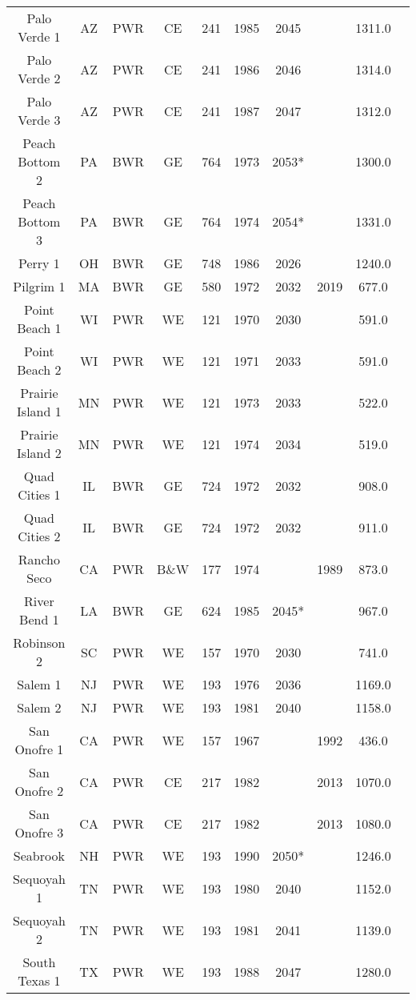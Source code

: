 \begin{table}
\begin{tabular}{c c c c c c c c c c}
    Palo Verde 1 & AZ & PWR & CE & 241 & 1985 & 2045 &  & 1311.0 \\
    Palo Verde 2 & AZ & PWR & CE & 241 & 1986 & 2046 &  & 1314.0 \\
    Palo Verde 3 & AZ & PWR & CE & 241 & 1987 & 2047 &  & 1312.0 \\
    Peach Bottom 2 & PA & BWR & GE & 764 & 1973 & 2053* &  & 1300.0 \\
    Peach Bottom 3 & PA & BWR & GE & 764 & 1974 & 2054* &  & 1331.0 \\
    Perry 1 & OH & BWR & GE & 748 & 1986 & 2026 &  & 1240.0 \\
    Pilgrim 1 & MA & BWR & GE & 580 & 1972 & 2032 & 2019 & 677.0 \\
    Point Beach 1 & WI & PWR & WE & 121 & 1970 & 2030 &  & 591.0 \\
    Point Beach 2 & WI & PWR & WE & 121 & 1971 & 2033 &  & 591.0 \\
    Prairie Island 1 & MN & PWR & WE & 121 & 1973 & 2033 &  & 522.0 \\
    Prairie Island 2 & MN & PWR & WE & 121 & 1974 & 2034 &  & 519.0 \\
    Quad Cities 1 & IL & BWR & GE & 724 & 1972 & 2032 &  & 908.0 \\
    Quad Cities 2 & IL & BWR & GE & 724 & 1972 & 2032 &  & 911.0 \\
    Rancho Seco & CA & PWR & B\&W & 177 & 1974 &  & 1989 & 873.0 \\
    River Bend 1 & LA & BWR & GE & 624 & 1985 & 2045* &  & 967.0 \\
    Robinson 2 & SC & PWR & WE & 157 & 1970 & 2030 &  & 741.0 \\
    Salem 1 & NJ & PWR & WE & 193 & 1976 & 2036 &  & 1169.0 \\
    Salem 2 & NJ & PWR & WE & 193 & 1981 & 2040 &  & 1158.0 \\
    San Onofre 1 & CA & PWR & WE & 157 & 1967 &  & 1992 & 436.0 \\
    San Onofre 2 & CA & PWR & CE & 217 & 1982 &  & 2013 & 1070.0 \\
    San Onofre 3 & CA & PWR & CE & 217 & 1982 &  & 2013 & 1080.0 \\
    Seabrook & NH & PWR & WE & 193 & 1990 & 2050* &  & 1246.0 \\
    Sequoyah 1 & TN & PWR & WE & 193 & 1980 & 2040 &  & 1152.0 \\
    Sequoyah 2 & TN & PWR & WE & 193 & 1981 & 2041 &  & 1139.0 \\
    South Texas 1 & TX & PWR & WE & 193 & 1988 & 2047 &  & 1280.0 \\

\end{tabular}
\end{table}
